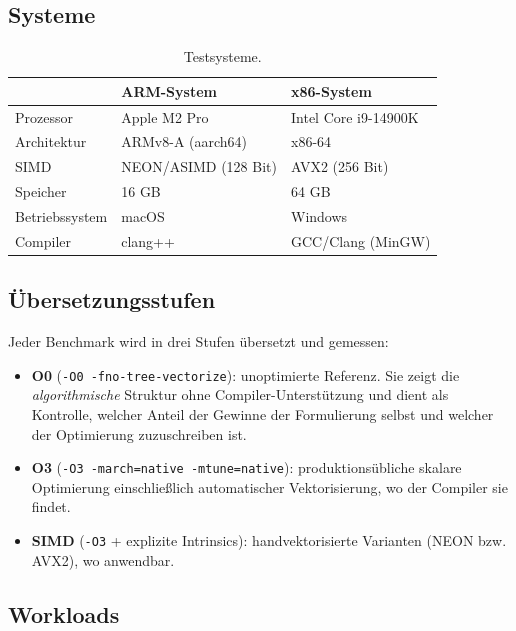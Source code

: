 \documentclass[11pt,a4paper]{scrartcl}
\theoremstyle{definition}
\theoremstyle{plain}
\theoremstyle{remark}
\begin{document}
\subsection{Systeme}

\begin{table}[htbp]
\centering
\caption{Testsysteme.}
\label{tab:systeme}
\small
\begin{tabular}{lll}
\toprule
 & ARM-System & x86-System \\
\midrule
Prozessor & Apple M2 Pro & Intel Core i9-14900K \\
Architektur & ARMv8-A (aarch64) & x86-64 \\
SIMD & NEON/ASIMD (128 Bit) & AVX2 (256 Bit) \\
Speicher & 16 GB & 64 GB \\
Betriebssystem & macOS & Windows \\
Compiler & clang++ & GCC/Clang (MinGW) \\
\bottomrule
\end{tabular}
\end{table}

\subsection{Übersetzungsstufen}

Jeder Benchmark wird in drei Stufen übersetzt und gemessen:

\begin{itemize}
\item \textbf{O0} (\texttt{-O0 -fno-tree-vectorize}): unoptimierte Referenz. Sie zeigt die \emph{algorithmische} Struktur ohne Compiler-Unterstützung und dient als Kontrolle, welcher Anteil der Gewinne der Formulierung selbst und welcher der Optimierung zuzuschreiben ist.
\item \textbf{O3} (\texttt{-O3 -march=native -mtune=native}): produktionsübliche skalare Optimierung einschließlich automatischer Vektorisierung, wo der Compiler sie findet.
\item \textbf{SIMD} (\texttt{-O3} + explizite Intrinsics): handvektorisierte Varianten (NEON bzw. AVX2), wo anwendbar.
\end{itemize}

\subsection{Workloads}
\end{document}
